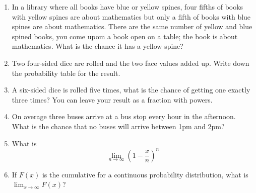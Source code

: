 \documentclass{article}
\newif\ifanswer
\begin{document}
\begin{enumerate}
  \ifanswer
    Solution: 
  $$x\setminus B = \{2,3,4\}$$
  \fi

\item In a library where all books have blue or yellow spines, four
  fifths of books with yellow spines are about mathematics but only
  a fifth of books with blue spines are about mathematics. There
  are the same number of yellow and blue spined books, you come upom a book open on a table; the book is about mathematics. What is the chance it has a yellow spine?

  \ifanswer
    Solution: In the obvious notation we need $p(M)$:
  $$p(M)=p(M|B)p(B)+p(M|Y)p(Y)=0.1+0.4=0.5$$
  and using Bayes:
  $$p(Y|M)=p(M|Y)p(Y)/p(M)=0.4/0.5=0.8$$
  \fi

\item Two four-sided dice are rolled and the two face values added up. Write down the probability table for the result.

  \ifanswer   Solution: $p(2)=1/16$, $p(3)=1/8$, $p(4)=3/16$, $p(5)=1/4$, $p(6)=3/16$, $p(7)=1/8$ and $p(8)=1/16$.
  \fi

  \item A six-sided dice is rolled five times, what is the chance of
    getting one exactly three times? You can leave your result as a fraction with powers.

    \ifanswer  Solution: 
    $$p=\left(\begin{array}{c}5\\3\end{array}\right)\frac{1}{6}^3\frac{5}{6}^2
      = \frac{20\times 5^2}{2\times 6^5}
      $$
      \fi

    \item On average three buses arrive at a bus stop every hour in the afternoon. What is the chance that no buses will arrive between 1pm and 2pm?

      \ifanswer  Solution: 
      $$p=e^{-3}$$
      \fi

    \item What is
      $$\lim_{n\rightarrow\infty}\left(1-\frac{x}{n}\right)^n$$

      \ifanswer
        Solution: 
      $$\lim_{n\rightarrow\infty}\left(1-\frac{x}{n}\right)^n=e^{-x}$$
        \fi
        
    \item If $F(x)$ is the cumulative for a continuous probability distribution, what is $\lim_{x\rightarrow\infty}F(x)$?


\end{enumerate}
\end{document}
